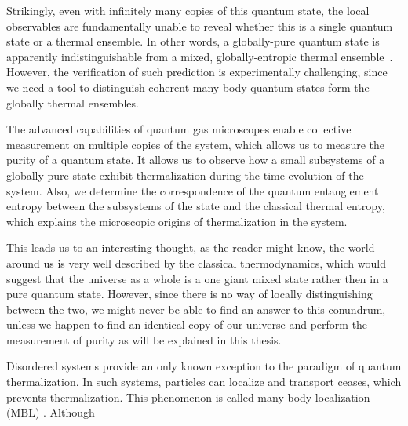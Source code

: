 Strikingly, even with infinitely many copies of this quantum state, the local observables are fundamentally unable to reveal whether this is a single quantum state or a thermal ensemble. In other words, a globally-pure quantum state is apparently indistinguishable from a mixed, globally-entropic thermal ensemble~\cite{Shankar1985, Deutsch1991, SrendickiETH, Olshanii2008}. However, the verification of such prediction is experimentally challenging, since we need a tool to distinguish coherent many-body quantum states form the globally thermal ensembles.

The advanced capabilities of quantum gas microscopes enable collective measurement on multiple copies of the system, which allows us to measure the purity of a quantum state. It allows us to observe how a small subsystems of a globally pure state exhibit thermalization during the time evolution of the system. Also, we determine the correspondence of the quantum entanglement entropy between the subsystems of the state and the classical thermal entropy, which explains the microscopic origins of thermalization in the system.

This leads us to an interesting thought, as the reader might know, the world around us is very well described by the classical thermodynamics, which would suggest that the universe as a whole is a one giant mixed state rather then in a pure quantum state. However, since there is no way of locally distinguishing between the two, we might never be able to find an answer to this conundrum, unless we happen to find an identical copy of our universe and perform the measurement of purity as will be explained in this thesis. 

Disordered systems provide an only known exception to the paradigm of quantum thermalization. In such systems, particles can localize and transport ceases, which prevents thermalization. This phenomenon is called many-body localization (MBL) \cite{ Anderson1958, Gornyi2005, Basko2006, Oganesyan2007}. Although 